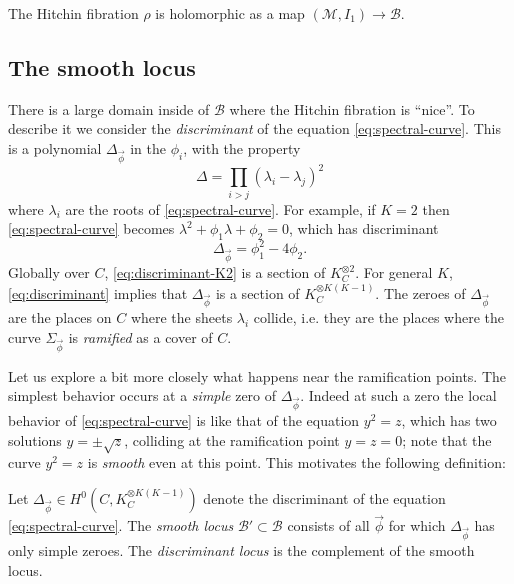 \documentclass[12pt,letterpaper,reqno]{article}
\numberwithin{equation}{section}
\newcommand{\cB}{\ensuremath{\mathcal B}}
\newcommand{\cM}{\ensuremath{\mathcal M}}
\newcommand{\ti}[1]{\textit{#1}}
\newcommand{\fixme}[1]{{\color{orange}{[#1]}}}
\begin{document}
\begin{prop} The Hitchin fibration $\rho$
is holomorphic as a map $(\cM, I_1) \to \cB$.
\end{prop}

\begin{pf} \fixme{...}
\end{pf}

\subsection{The smooth locus}

There is a large domain inside of $\cB$ where the Hitchin
fibration is ``nice''. To describe it we consider the \ti{discriminant}
of the equation \eqref{eq:spectral-curve}.
This is a polynomial $\Delta_{\vec\phi}$ in the $\phi_i$,
with the property
\begin{equation} \label{eq:discriminant}
  \Delta = \prod_{i > j} (\lambda_i - \lambda_j)^2
\end{equation}
where $\lambda_i$ are the roots of \eqref{eq:spectral-curve}.
For example, if $K=2$
then \eqref{eq:spectral-curve} becomes
$\lambda^2 + \phi_1 \lambda + \phi_2 = 0$, which has discriminant
\begin{equation} \label{eq:discriminant-K2}
  \Delta_{\vec\phi} = \phi_1^2 - 4 \phi_2.
\end{equation}
Globally over $C$, \eqref{eq:discriminant-K2}
is a section of $K_C^{\otimes 2}$.
For general $K$, \eqref{eq:discriminant} implies that
$\Delta_{\vec\phi}$ is a section of $K_C^{\otimes K(K-1)}$.
The zeroes of $\Delta_{\vec\phi}$ are the places on $C$ where the
sheets $\lambda_i$ collide, i.e. they are the places where
the curve $\Sigma_{\vec\phi}$ is \ti{ramified} as a cover of $C$.

Let us explore a bit more closely what happens near the ramification
points.
The simplest behavior occurs at a \ti{simple} zero of $\Delta_{\vec\phi}$.
Indeed at such a zero the local behavior of \eqref{eq:spectral-curve}
is like that of the
equation $y^2 = z$, which has
two solutions $y = \pm \sqrt{z}$, colliding at the ramification point
$y=z=0$; note that the curve $y^2 = z$ is \ti{smooth} even at this point.
This motivates the following definition:

\begin{defn}
Let $\Delta_{\vec\phi} \in H^0(C, K_C^{\otimes K(K-1)})$ denote the discriminant of the
equation \eqref{eq:spectral-curve}.
The \ti{smooth locus} $\cB' \subset \cB$ consists of all $\vec\phi$
for which $\Delta_{\vec\phi}$ has only simple zeroes.
The \ti{discriminant locus} is the complement of the smooth locus.
\end{defn}
\end{document}
